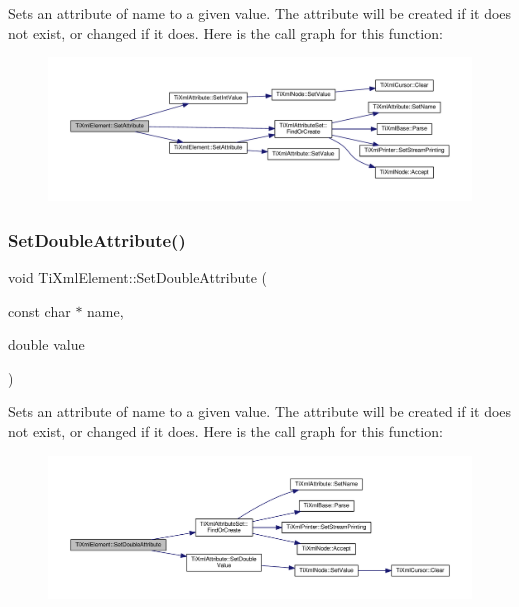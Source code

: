 Sets an attribute of name to a given value. The attribute will be created if it does not exist, or changed if it does. Here is the call graph for this function\+:
\nopagebreak
\begin{figure}[H]
\begin{center}
\leavevmode
\includegraphics[width=350pt]{class_ti_xml_element_ace6f4be75e373726d4774073d666d1a7_cgraph}
\end{center}
\end{figure}
\mbox{\label{class_ti_xml_element_a0d1dd975d75496778177e35abfe0ec0b}} 
\subsubsection{\texorpdfstring{Set\+Double\+Attribute()}{SetDoubleAttribute()}}
{\footnotesize\ttfamily void Ti\+Xml\+Element\+::\+Set\+Double\+Attribute (\begin{DoxyParamCaption}\item[{const char $\ast$}]{name,  }\item[{double}]{value }\end{DoxyParamCaption})}

Sets an attribute of name to a given value. The attribute will be created if it does not exist, or changed if it does. Here is the call graph for this function\+:
\nopagebreak
\begin{figure}[H]
\begin{center}
\leavevmode
\includegraphics[width=350pt]{class_ti_xml_element_a0d1dd975d75496778177e35abfe0ec0b_cgraph}
\end{center}
\end{figure}
\mbox{\label{class_ti_xml_element_a940fc8aa953e0ef0de6e110b7d98b8ee}} 
